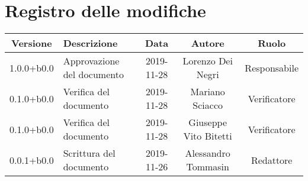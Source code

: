 \section*{Registro delle modifiche}

\begin{center}
	\begin{longtable}{|c|p{3cm}|c|c|c|}
	\hline
	\rowcolor{lighter-grayer}
	\textbf{Versione} & \textbf{Descrizione} & \textbf{Data} & \textbf{Autore} & \textbf{Ruolo} \\
	\hline
	\endfirsthead


	1.0.0+b0.0 & Approvazione del documento & 2019-11-28 & Lorenzo Dei Negri & Responsabile \\
	\hline
	0.1.0+b0.0 & Verifica del documento & 2019-11-28 & Mariano Sciacco & Verificatore \\
	\hline
	0.1.0+b0.0 & Verifica del documento & 2019-11-28 & Giuseppe Vito Bitetti & Verificatore \\
	\hline
	0.0.1+b0.0 & Scrittura del documento & 2019-11-26 & Alessandro Tommasin & Redattore \\

	\hline

	\end{longtable}
\end{center}
